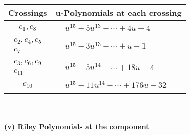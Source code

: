 \documentclass[1p]{elsarticle_modified}
\theoremstyle{definition}
\begin{document}
\begin{tabular}{m{50pt}|m{274pt}}
Crossings & \hspace{64pt}u-Polynomials at each crossing \\
\hline $$\begin{aligned}c_{1},c_{8}\end{aligned}$$&$\begin{aligned}
&u^{15}+5 u^{13}+\cdots+4 u-4
\end{aligned}$\\
\hline $$\begin{aligned}c_{2},c_{4},c_{5}\\c_{7}\end{aligned}$$&$\begin{aligned}
&u^{15}-3 u^{13}+\cdots+u-1
\end{aligned}$\\
\hline $$\begin{aligned}c_{3},c_{6},c_{9}\\c_{11}\end{aligned}$$&$\begin{aligned}
&u^{15}-5 u^{14}+\cdots+18 u-4
\end{aligned}$\\
\hline $$\begin{aligned}c_{10}\end{aligned}$$&$\begin{aligned}
&u^{15}-11 u^{14}+\cdots+176 u-32
\end{aligned}$\\
\hline
\end{tabular}\\~\\
\newpage\renewcommand{\arraystretch}{1}
\flushleft \textbf{(v) Riley Polynomials at the component}\newline \\
\end{document}
